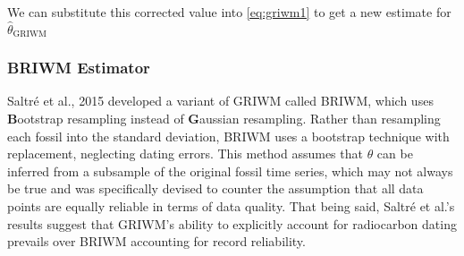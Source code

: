 We can substitute this corrected value into \autoref{eq:griwm1} to get a new estimate for $\hat\theta_{\text{GRIWM}}$

\subsubsection{BRIWM Estimator}

Saltr\'e et al., 2015 \parencite{Saltre2015} developed a variant of GRIWM called BRIWM, which uses \textbf{B}ootstrap resampling instead of \textbf{G}aussian resampling. Rather than resampling each fossil into the standard deviation, BRIWM uses a bootstrap technique with replacement, neglecting dating errors. This method assumes that $\theta$ can be inferred from a subsample of the original fossil time series, which may not always be true and was specifically devised to counter the assumption that all data points are equally reliable in terms of data quality. That being said, Saltr\'e et al.'s results suggest that GRIWM's ability to explicitly account for radiocarbon dating prevails over BRIWM accounting for record reliability.